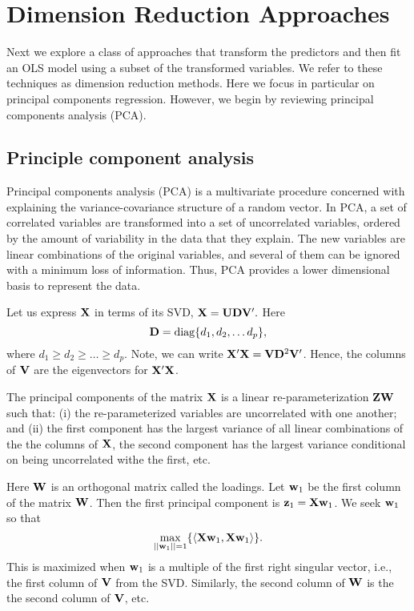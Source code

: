 \section{Dimension Reduction Approaches}

Next we explore a class of approaches that transform the predictors and then fit an OLS model using a subset of the transformed variables.
We refer to these techniques as dimension reduction methods.
Here we focus in particular on principal components regression. However, we begin by reviewing 
principal components analysis (PCA).

\subsection{Principle component analysis}

Principal components analysis (PCA) is a multivariate procedure concerned with explaining the variance-covariance structure of a random vector. 
In PCA, a set of correlated variables are transformed into a set of uncorrelated variables, ordered by the amount of variability in the data that they explain. 
The new variables are linear combinations of the original variables, and several of them can be ignored with a minimum loss of information.
Thus, PCA provides a lower dimensional basis to represent the data. 

Let us express $\mathbf{X}$ in terms of its SVD,  $\mathbf{X} = \mathbf{U} \mathbf{D} \mathbf{V}'.$
Here $$\mathbf{D} = \mathrm{diag}\{d_1, d_2, \ldots d_p\},$$ where $d_1 \ge d_2 \ge \ldots \ge d_p$.
Note, we can write $\mathbf{X}' \mathbf{X} = \mathbf{V} \mathbf{D}^2 \mathbf{V}'$.
Hence, the columns of $\mathbf{V}$ are the eigenvectors for $\mathbf{X}' \mathbf{X}$.

The principal components of the matrix $\mathbf{X}$ is a linear re-parameterization $\mathbf{Z} \mathbf{W}$ such that:
(i) the re-parameterized variables are uncorrelated with one another; and (ii) the first component has the largest variance of all linear combinations of the the columns of $\mathbf{X}$, the second component has the largest variance conditional on being uncorrelated withe the first, etc. 

Here $\mathbf{W}$ is an orthogonal matrix called the loadings.
Let ${\bf w}_1$ be the first column of the matrix $\mathbf{W}$.
Then the first principal component is $\mathbf{z}_1 = \mathbf{X} {\bf w}_1$.
We seek ${\bf w}_1$ so that
$$
\max_{||{\bf w}_1||=1} \{ \langle \mathbf{X} {\bf w}_1, \mathbf{X} {\bf w}_1 \rangle \}.
$$
This is maximized when ${\bf w}_1$ is a multiple of the first right singular vector, i.e., the first column of $\mathbf{V}$ from the SVD.
Similarly, the second column of $\mathbf{W}$ is the the second column of $\mathbf{V}$, etc.

